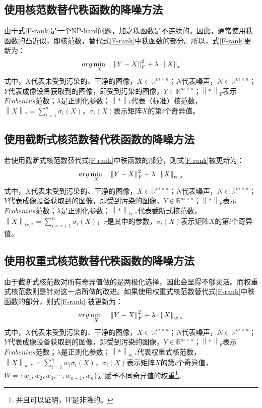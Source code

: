 \documentclass[12pt, a4paper]{article}
\begin{document}
\subsection{使用核范数替代秩函数的降噪方法}
\par 由于式\ref{F-rank}是一个NP-hard问题，加之秩函数是不连续的。因此，通常使用秩函数的凸近似，即核范数，替代式\ref{F-rank}中秩函数的部分。所以，式\ref{F-rank}更新为：
\begin{equation}
\centering
arg\min\limits_{X} \quad \left\|Y-X\right\|_F^2 + \lambda \cdot \left\|X\right\|_*
\label{F-nn}
\end{equation}
式中，$X$代表未受到污染的、干净的图像，$X \in \mathbb{R}^{m \times n}$；$N$代表噪声，$N \in \mathbb{R}^{m \times n}$；$Y$代表成像设备获取到的图像，即受到污染的图像，$Y \in \mathbb{R}^{m \times n}$；$\left\|*\right\|_F$表示$Frobenius$范数；$\lambda$是正则化参数；$\left\|*\right\|_*$代表（标准）核范数，$\left\|X\right\|_* = \sum\limits_{i=1}^{n}\sigma_i(X)$，$\sigma_i(X)$表示矩阵$X$的第$i$个奇异值。
\subsection{使用截断式核范数替代秩函数的降噪方法}
\par 若使用截断式核范数替代式\ref{F-rank}中秩函数的部分，则式\ref{F-rank}被更新为：
\begin{equation}
\centering
arg\min\limits_{X} \quad \left\|Y-X\right\|_F^2 + \lambda \cdot \left\|X\right\|_{tr,*}
\label{F-tnn}
\end{equation}
式中，$X$代表未受到污染的、干净的图像，$X \in \mathbb{R}^{m \times n}$；$N$代表噪声，$N \in \mathbb{R}^{m \times n}$；$Y$代表成像设备获取到的图像，即受到污染的图像，$Y \in \mathbb{R}^{m \times n}$；$\left\|*\right\|_F$表示$Frobenius$范数；$\lambda$是正则化参数；$\left\|*\right\|_{tr,*}$代表截断式核范数，$\left\|X\right\|_{tr,*} = \sum\limits_{i=r+1}^{n}\sigma_i(X)$，$r$是其中的参数，$\sigma_i(X)$表示矩阵$X$的第$i$个奇异值。
\subsection{使用权重式核范数替代秩函数的降噪方法}
\par 由于截断式核范数对所有奇异值做的是两极化选择，因此会显得不够灵活。而权重式核范数则是针对这一点所做的改进。如果使用权重式核范数替代式\ref{F-rank}中秩函数的部分，则式\ref{F-rank} 被更新为：
\begin{equation}
\centering
arg\min\limits_{X} \quad \left\|Y-X\right\|_F^2 + \lambda \cdot \left\|X\right\|_{w,*}
\label{F-wnn}
\end{equation}
式中，$X$代表未受到污染的、干净的图像，$X \in \mathbb{R}^{m \times n}$；$N$代表噪声，$N \in \mathbb{R}^{m \times n}$；$Y$代表成像设备获取到的图像，即受到污染的图像，$Y \in \mathbb{R}^{m \times n}$；$\left\|*\right\|_F$表示$Frobenius$范数；$\lambda$是正则化参数；$\left\|*\right\|_{w,*}$代表权重式核范数，$\left\|X\right\|_{w,*} = \sum\limits_{i=1}^{n}w_i\sigma_i(X)$，$\sigma_i(X)$表示矩阵$X$的第$i$个奇异值，$W=\{w_1, w_2, w_3, \cdots, w_{n-1}, w_{n}\}$是赋予不同奇异值的权重\footnote{并且可以证明，$W$是非降的。}。
\end{document}
